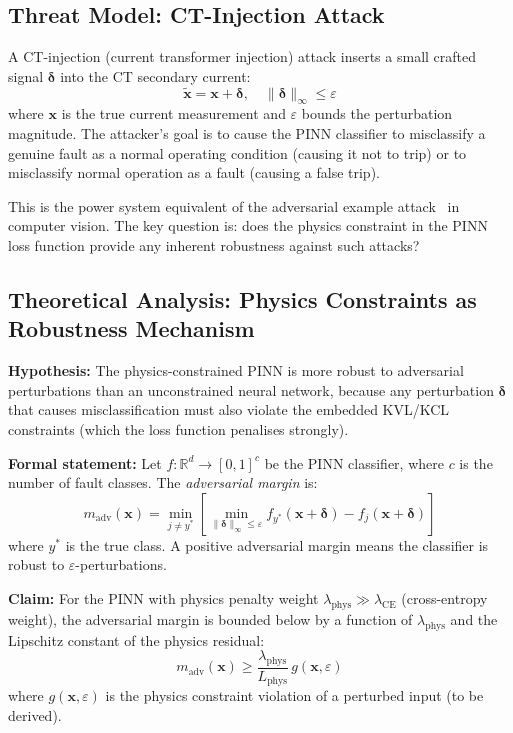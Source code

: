 \subsection{Threat Model: CT-Injection Attack}

A CT-injection (current transformer injection) attack inserts a small
crafted signal $\bm{\delta}$ into the CT secondary current:
\begin{equation}
  \tilde{\mathbf{x}} = \mathbf{x} + \bm{\delta}, \quad
  \|\bm{\delta}\|_\infty \leq \varepsilon
  \label{eq:ch12_ct_attack}
\end{equation}
where $\mathbf{x}$ is the true current measurement and $\varepsilon$
bounds the perturbation magnitude. The attacker's goal is to cause
the PINN classifier to misclassify a genuine fault as a normal operating
condition (causing it not to trip) or to misclassify normal operation
as a fault (causing a false trip).

This is the power system equivalent of the adversarial example
attack~\citep{Goodfellow2015} in computer vision. The key question is:
does the physics constraint in the PINN loss function provide any inherent
robustness against such attacks?

\subsection{Theoretical Analysis: Physics Constraints as Robustness Mechanism}

\textbf{Hypothesis:} The physics-constrained PINN is more robust to
adversarial perturbations than an unconstrained neural network, because
any perturbation $\bm{\delta}$ that causes misclassification must also
violate the embedded KVL/KCL constraints (which the loss function penalises
strongly).

\textbf{Formal statement:} Let $f: \mathbb{R}^d \to [0,1]^c$ be the
PINN classifier, where $c$ is the number of fault classes. The
\emph{adversarial margin} is:
\begin{equation}
  m_\mathrm{adv}(\mathbf{x}) = \min_{j \neq y^\ast}
    \left[\min_{\|\bm{\delta}\|_\infty \leq \varepsilon}
    f_{y^\ast}(\mathbf{x} + \bm{\delta}) - f_j(\mathbf{x} + \bm{\delta})\right]
  \label{eq:ch12_adv_margin}
\end{equation}
where $y^\ast$ is the true class. A positive adversarial margin means the
classifier is robust to $\varepsilon$-perturbations.

\textbf{Claim:} For the PINN with physics penalty weight
$\lambda_\mathrm{phys} \gg \lambda_\mathrm{CE}$ (cross-entropy weight),
the adversarial margin is bounded below by a function of
$\lambda_\mathrm{phys}$ and the Lipschitz constant of the physics residual:
\begin{equation}
  m_\mathrm{adv}(\mathbf{x}) \geq \frac{\lambda_\mathrm{phys}}{L_\mathrm{phys}}\,
    g(\mathbf{x}, \varepsilon)
  \label{eq:ch12_margin_bound}
\end{equation}
where $g(\mathbf{x}, \varepsilon)$ is the physics constraint violation
of a perturbed input (to be derived).

